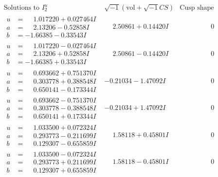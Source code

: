 \documentclass[1p]{elsarticle_modified}
\theoremstyle{definition}
\newcommand{\I}{\sqrt{-1}}
\begin{document}
$$\begin{array}{c|c|c}  
\text{Solutions to }I^u_{2}& \I (\text{vol} + \sqrt{-1}CS) & \text{Cusp shape}\\
 \hline 
\begin{aligned}
u &= \phantom{-}1.017220 + 0.027464 I \\
a &= \phantom{-}2.13206 - 0.52858 I \\
b &= -1.66385 - 0.33543 I\end{aligned}
 & \phantom{-}2.50861 + 0.14420 I & \phantom{-0.000000 } 0 \\ \hline\begin{aligned}
u &= \phantom{-}1.017220 - 0.027464 I \\
a &= \phantom{-}2.13206 + 0.52858 I \\
b &= -1.66385 + 0.33543 I\end{aligned}
 & \phantom{-}2.50861 - 0.14420 I & \phantom{-0.000000 } 0 \\ \hline\begin{aligned}
u &= \phantom{-}0.693662 + 0.751370 I \\
a &= \phantom{-}0.303778 + 0.388548 I \\
b &= \phantom{-}0.650141 - 0.173344 I\end{aligned}
 & -0.21034 - 1.47092 I & \phantom{-0.000000 } 0 \\ \hline\begin{aligned}
u &= \phantom{-}0.693662 - 0.751370 I \\
a &= \phantom{-}0.303778 - 0.388548 I \\
b &= \phantom{-}0.650141 + 0.173344 I\end{aligned}
 & -0.21034 + 1.47092 I & \phantom{-0.000000 } 0 \\ \hline\begin{aligned}
u &= \phantom{-}1.033500 + 0.072324 I \\
a &= \phantom{-}0.293773 - 0.211699 I \\
b &= \phantom{-}0.129307 - 0.655859 I\end{aligned}
 & \phantom{-}1.58118 + 0.45801 I & \phantom{-0.000000 } 0 \\ \hline\begin{aligned}
u &= \phantom{-}1.033500 - 0.072324 I \\
a &= \phantom{-}0.293773 + 0.211699 I \\
b &= \phantom{-}0.129307 + 0.655859 I\end{aligned}
 & \phantom{-}1.58118 - 0.45801 I & \phantom{-0.000000 } 0 \\ \hline\begin{aligned}

\end{aligned}
\end{array}$$
\end{document}
